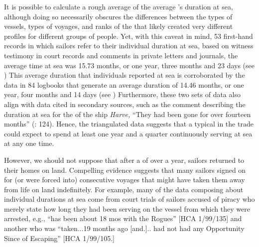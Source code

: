 It is possible to calculate a rough average of the average ’s duration at sea, although doing so necessarily obscures the differences between the types of vessels, types of voyages, and ranks of the  that likely created very different profiles for different groups of people. Yet, with this caveat in mind, 53 first-hand records in which sailors refer to their individual duration at sea, based on witness testimony in court records and comments in private letters and journals, the average time at sea was 15.73 months, or one year, three months and 23 days (see ) This average duration that individuals reported at sea is corroborated by the data in 84 logbooks that generate an average  duration of 14.46 months, or one year, four months and 14 days (see ) Furthermore, these two sets of data also align with data cited in secondary sources, such as the comment describing the duration at sea for the  of the  ship \textit{Harve,} “They had been gone for over fourteen months” (\citealt{Bicheno2012}: 124). Hence, the triangulated data suggests that a typical  in the  trade could expect to spend at least one year and a quarter continuously serving at sea at any one time. 

However, we should not suppose that after a  of over a year, sailors returned to their homes on land. Compelling evidence suggests that many sailors signed on for (or were forced into) consecutive voyages that might have taken them away from life on land indefinitely. For example, many of the data composing  about individual durations at sea come from court trials of sailors accused of piracy who merely state how long they had been serving on the vessel from which they were arrested, e.g., “has been about 18 mos with the Rogues” [HCA 1/99/135] and another  who was “taken...19 months ago [and.].. had not had any Opportunity Since of Escaping” [HCA 1/99/105.]


